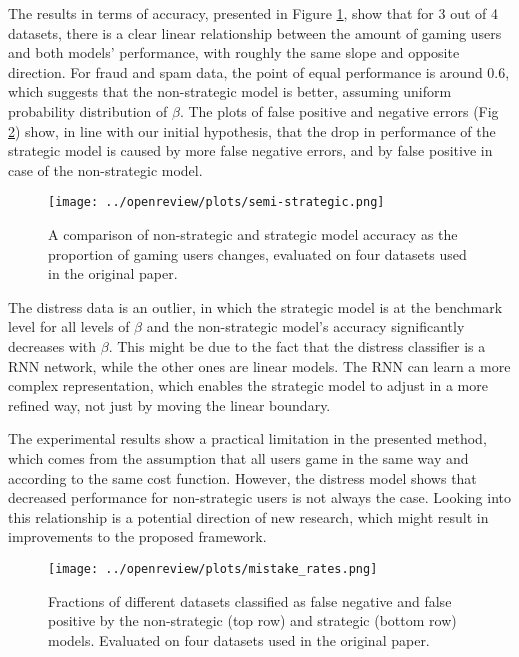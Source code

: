 The results in terms of accuracy, presented in Figure \ref{fig:semi-strat}, show that for 3 out of 4 datasets, there is a clear linear relationship between the amount of gaming users and both models' performance, with roughly the same slope and opposite direction. For fraud and spam data, the point of equal performance is around 0.6, which suggests that the non-strategic model is better, assuming uniform probability distribution of $\beta$. The plots of false positive and negative errors (Fig \ref{fig:confusion}) show, in line with our initial hypothesis, that the drop in performance of the strategic model is caused by more false negative errors, and by false positive in case of the non-strategic model.

\begin{figure}[H]
    \centering
    \texttt{[image: ../openreview/plots/semi-strategic.png]}
    \caption{A comparison of non-strategic and strategic model accuracy as the proportion of gaming  users changes, evaluated on four datasets used in the original paper. }
    \label{fig:semi-strat}
\end{figure}

The distress data is an outlier, in which the strategic model is at the benchmark level for all levels of $\beta$ and the non-strategic model's accuracy significantly decreases with $\beta$. This might be due to the fact that the distress classifier is a RNN network, while the other ones are linear models. The RNN can learn a more complex representation, which enables the strategic model to adjust in a more refined way, not just by moving the linear boundary. 

The experimental results show a practical limitation in the presented method, which comes from the assumption that all users game in the same way and according to the same cost function. However, the distress model shows that decreased performance for non-strategic users is not always the case. Looking into this relationship is a potential direction of new research, which might result in improvements to the proposed framework.

\begin{figure}[H]
    \centering
    \texttt{[image: ../openreview/plots/mistake\_rates.png]}
    \caption{Fractions of different datasets classified as false negative and false positive by the non-strategic (top row) and strategic (bottom row) models. Evaluated on four datasets used in the original paper. }
    \label{fig:confusion}
\end{figure}


